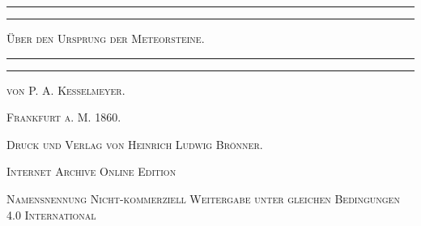 \documentclass[a4paper, 11pt, oneside, polutonikogreek, german]{article}
\begin{document}
\begin{titlepage} %
	\centering %

	
	\rule{\textwidth}{1.6pt}\vspace*{-\baselineskip}\vspace*{2pt} %
	\rule{\textwidth}{0.4pt} %
	
	\vspace{1\baselineskip} %
	
	{\scshape\LARGE Über den Ursprung der Meteorsteine.}
	
	\vspace{1\baselineskip} %

	\rule{\textwidth}{0.4pt}\vspace*{-\baselineskip}\vspace{3.2pt} %
	\rule{\textwidth}{1.6pt} %
	
	\vspace{1\baselineskip} %
	
	
	{\scshape von P. A. Kesselmeyer.} %
	
	\vspace*{1\baselineskip} %
    
    \vspace*{\fill}

	\vspace{1\baselineskip}

	{\small\scshape Frankfurt a. M. 1860.}
	
	{\small\scshape{Druck und Verlag von Heinrich Ludwig Brönner.}}
	
	\vspace{0.5\baselineskip} %

    \scshape Internet Archive Online Edition  %
	
	{\scshape\small Namensnennung Nicht-kommerziell Weitergabe unter gleichen Bedingungen 4.0 International} %
\end{titlepage}
\setlength{\parskip}{1mm plus1mm minus1mm}
\clearpage
\tableofcontents
\clearpage
\end{document}
